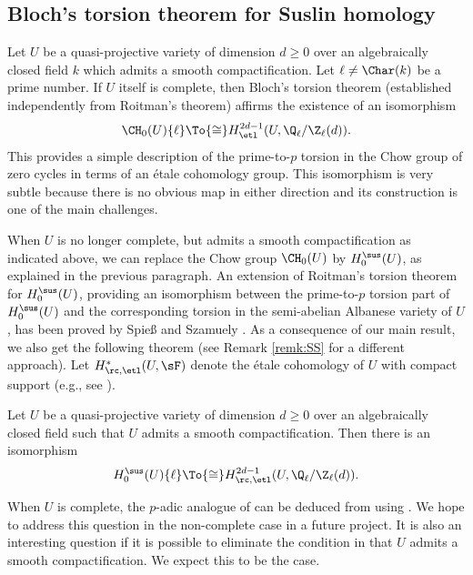 \subsection{Bloch's torsion theorem for Suslin homology}
\label{sec:BTor}
Let $U$ be a quasi-projective variety of dimension $d \ge 0$
over an algebraically closed
field $k$ which admits a smooth compactification.
Let $\ell \neq \Char(k)$ be a prime number.
If $U$ itself is complete, then Bloch's torsion theorem \cite{Bloch-torsion}
(established independently from Roitman's theorem)
affirms the existence of an isomorphism
\[ \CH_0(U)\{\ell\} \To{\cong}
H^{2d-1}_{\etl}(U, {\Q_\ell}/{\Z_\ell}(d)).\]
This provides a simple description of the
prime-to-$p$ torsion in the Chow group of zero cycles in terms of an étale
cohomology group.
This isomorphism is very subtle because there is no obvious map
in either direction and its construction is one of the main challenges.

When $U$ is no longer complete, but admits a smooth compactification as indicated above, we can replace the Chow group $\CH_0(U)$ by $H_0^{\sus}(U)$, as explained in the previous paragraph. An extension of Roitman's torsion theorem for $H_0^{\sus}(U)$, providing an isomorphism between the prime-to-$p$ torsion part of $H_0^{\sus}(U)$ and the corresponding torsion in the semi-abelian Albanese variety of $U$, has been proved by
Spie{\ss} and \hbox{Szamuely} \cite{SS}. As a consequence of our main result, we also get the following theorem (see Remark \ref{remk:SS} for a different approach).
Let $H^*_{\rc, \etl}(U, \sF)$ denote the étale cohomology of $U$ with
compact support (e.g., see \cite{Milne}).

\begin{thm}\label{thm:Main-7}
Let $U$ be a quasi-projective variety of dimension $d \ge 0$
over an algebraically closed field such that $U$ admits a smooth compactification.
Then there is an isomorphism
\[
H^{\sus}_0(U)\{\ell\} \To{\cong}
H^{2d-1}_{\rc, \etl}(U, {\Q_\ell}/{\Z_\ell}(d)).
\]
\end{thm}

\begin{remk}\label{remk:p-adic-tor}
When $U$ is complete, the $p$-adic analogue of
 can be deduced from \cite[Cor.\,3.18]{GS} using
\cite[Th.\,8.1]{GL}.
We hope to address this question in the non-complete case in a future project.
It is also an interesting question if it is possible to eliminate
the condition in  that $U$ admits a smooth compactification.
We expect this to be the case.
\end{remk}

